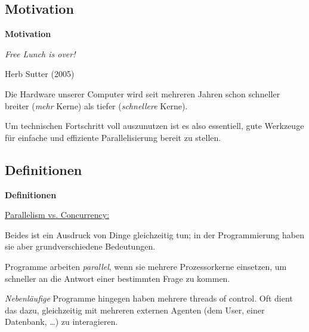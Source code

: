 \documentclass{beamer}
\begin{document}
\subsection{Motivation}


\begin{frame}[fragile]

\begin{center}
\Large
\textbf{Motivation}
\end{center}

\end{frame}


\begin{frame}[fragile]

\begin{center}
\huge
\emph{Free Lunch is over!}\bigskip

\normalsize
Herb Sutter (2005)
\end{center}
\pause
Die Hardware unserer Computer wird seit mehreren Jahren schon schneller breiter (\emph{mehr} Kerne) als tiefer (\emph{schnellere} Kerne).\pause\smallskip

Um technischen Fortschritt voll auszunutzen ist es also essentiell, gute Werkzeuge für einfache und effiziente Parallelisierung bereit zu stellen.
\end{frame}


\subsection{Definitionen}

\begin{frame}[fragile]

\begin{center}
\Large
\textbf{Definitionen}
\end{center}

\end{frame}


\begin{frame}
\underline{Parallelism vs. Concurrency:}\smallskip

Beides ist ein Ausdruck von \glqq Dinge gleichzeitig tun\grqq ; in der Programmierung haben sie aber grundverschiedene Bedeutungen.\pause\bigskip

Programme arbeiten \emph{parallel}, wenn sie mehrere Prozessorkerne einsetzen, um schneller an die Antwort einer bestimmten Frage zu kommen.\pause\bigskip

\emph{Nebenläufige} Programme hingegen haben mehrere \glqq threads of control\grqq . Oft dient das dazu, gleichzeitig mit mehreren externen Agenten (dem User, einer Datenbank, \dots) zu interagieren.
\end{frame}
\end{document}
